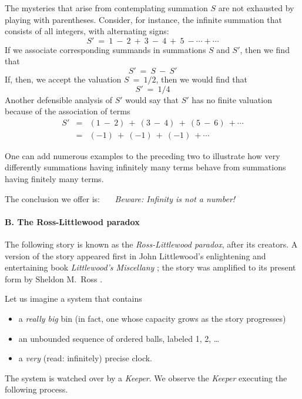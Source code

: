 The mysteries that arise from contemplating summation $S$ are not exhausted by playing with parentheses.  Consider, for instance, the infinite summation that consists of all integers, with alternating signs:
\[ S' \ = \ 1 \ - \ 2 \ + \ 3 \ - \ 4 \ + \ 5 \ - \cdots + \cdots \]
If we associate corresponding summands in summations $S$ and $S'$, then we find that
\[ S'  \ = \  S  \ - \ S'  \]
If, then, we accept the valuation $S \ = \ 1/2$, then we would find that
\[ S' \ = \ 1/4 \]
Another defensible analysis of $S'$ would say that $S'$ has no finite valuation because of the association of terms
\begin{eqnarray*}
S' & = & (1 \ - \ 2) \ + \ (3 \ - \ 4) \ + \ (5 \ - \ 6) \ + \cdots \\
    & = & (-1) \ + \ (-1) \ + \ (-1) \ +  \cdots
\end{eqnarray*}

\medskip

One can add numerous examples to the preceding two to illustrate how very differently summations having infinitely many terms behave from summations having finitely many terms.

The conclusion we offer is: \ \ \ {\em Beware:  Infinity is not a number!}

\paragraph{B. The Ross-Littlewood paradox}

  
The following story is known as the {\it Ross-Littlewood paradox}, after its creators.  A version of the story appeared first in John Littlewood's enlightening and entertaining book {\it Littlewood's Miscellany} \cite{Littlewood-misc}; the story was amplified to its present form by Sheldon M.~Ross \cite{Ross76}. 

\medskip

Let us imagine a system that contains
\begin{itemize}
\item
a {\em really big} bin (in fact, one whose capacity grows as the story progresses)

\medskip\item
an unbounded sequence of ordered balls, labeled 1, 2, \ldots

\medskip\item
a {\em very} (read: infinitely) precise clock.
\end{itemize}
The system is watched over by a {\it Keeper}.  We observe the {\it Keeper} executing the following process.

